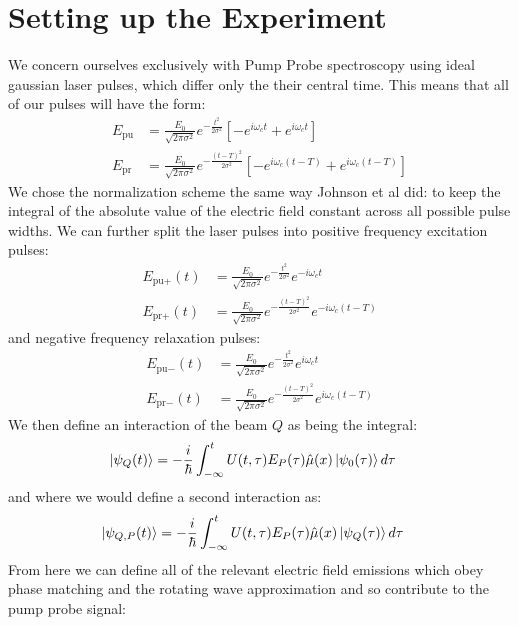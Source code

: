 \section{Setting up the Experiment}
We concern ourselves exclusively with Pump Probe spectroscopy using ideal gaussian laser pulses, which differ only the their central time.  This means that all of our pulses will have the form:
\begin{align}
	E_{\text{pu}} &= \frac{E_0}{\sqrt{2 \pi \sigma^2}} e^{-\frac{t^2}{2 \sigma^2} } \left[ -e^{i \omega_c t} + e^{i \omega_c t} \right]\\
	E_{\text{pr}} &= \frac{E_0}{\sqrt{2 \pi \sigma^2}} e^{-\frac{\left(t-T\right)^2}{2 \sigma^2} } \left[ -e^{i \omega_c \left(t-T\right)} + e^{i \omega_c \left(t-T\right)} \right]
\end{align}
We chose the normalization scheme the same way Johnson et al did: to keep the integral of the absolute value of the electric field constant across all possible pulse widths.  We can further split the laser pulses into positive frequency excitation pulses:
\begin{align}
	E_{\text{pu}+}(t) &= \frac{E_0}{\sqrt{2 \pi \sigma^2}} e^{-\frac{t^2}{2 \sigma^2} } e^{-i \omega_c t} \\
	E_{\text{pr}+}(t) &= \frac{E_0}{\sqrt{2 \pi \sigma^2}} e^{-\frac{\left(t-T\right)^2}{2 \sigma^2} }  e^{-i \omega_c \left(t-T\right)}
\end{align}
and negative frequency relaxation pulses:
\begin{align}
	E_{\text{pu}-}(t) &= \frac{E_0}{\sqrt{2 \pi \sigma^2}} e^{-\frac{t^2}{2 \sigma^2} } e^{i \omega_c t} \\
	E_{\text{pr}-}(t) &= \frac{E_0}{\sqrt{2 \pi \sigma^2}} e^{-\frac{\left(t-T\right)^2}{2 \sigma^2} }  e^{i \omega_c \left(t-T\right)}
\end{align}
We then define an interaction of the beam $Q$ as being the integral:
\begin{align}
	\ket{\psi_{Q} (t)}  &= -\frac{i}{\hbar} \int_{-\infty}^{t} U(t, \tau) E_{P}(\tau) \hat{\mu}(x) \ket{\psi_0 (\tau)} d \tau
\end{align}
and where we would define a second interaction as:
\begin{align}
	\ket{\psi_{Q, P} (t)}  &= -\frac{i}{\hbar} \int_{-\infty}^{t} U(t, \tau) E_P (\tau) \hat{\mu}(x) \ket{\psi_Q (\tau)} d \tau
\end{align}
From here we can define all of the relevant electric field emissions which obey phase matching and the rotating wave approximation and so contribute to the pump probe signal:
